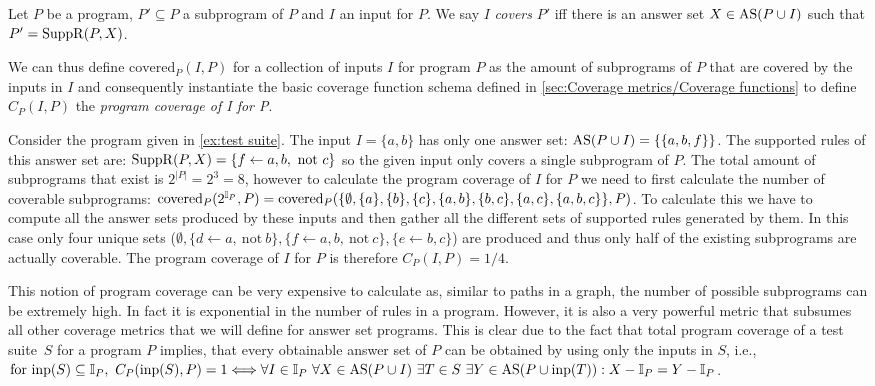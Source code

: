 \begin{definition}
\label{def:program coverage}
    Let $P$ be a program, \(P' \subseteq P\) a subprogram of $P$ and $I$ an input for $P$. We say $I$ \emph{covers} $P'$ iff there is an answer set \(X \in \operatorname{AS}(P \cup I)\) such that \(P' = \operatorname{SuppR}(P, X)\).
\end{definition}

We can thus define \(\text{covered}_P(I, P)\) for a collection of inputs $I$ for program $P$ as the amount of subprograms of $P$ that are covered by the inputs in $I$ and consequently instantiate the basic coverage function schema defined in \cref{sec:Coverage metrics/Coverage functions} to define \(C_P(I, P)\) the \emph{program coverage of I for P}.

\begin{example}
\label{ex:program coverage}
    Consider the program given in \cref{ex:test suite}. The input \(I = \{a, b\}\) has only one answer set: \(\operatorname{AS}(P \cup I) = \{\{a, b, f\}\}\). The supported rules of this answer set are: \(\SuppR(P, X) = \{f \leftarrow a, b,\ \text{not}\ c\}\) so the given input only covers a single subprogram of $P$. The total amount of subprograms that exist is \(2^{|P|} = 2^3 = 8\), however to calculate the program coverage of $I$ for $P$ we need to first calculate the number of coverable subprograms: \(\text{covered}_P(2^{\mathbb{I}_P},P) = \text{covered}_P(\{\emptyset, \{a\}, \{b\}, \{c\}, \{a, b\}, \{b, c\}, \{a, c\}, \\ \{a, b, c\}\},P)\). To calculate this we have to compute all the answer sets produced by these inputs and then gather all the different sets of supported rules generated by them. In this case only four unique sets (\(\emptyset, \{d \leftarrow a,\ \text{not}\ b\}, \{f \leftarrow a, b,\ \text{not}\ c\}, \{e \leftarrow b, c\}\)) are produced and thus only half of the existing subprograms are actually coverable. The program coverage of $I$ for $P$ is therefore \(C_P(I, P) = 1/4\).
\end{example}

This notion of program coverage can be very expensive to calculate as, similar to paths in a graph, the number of possible subprograms can be extremely high. In fact it is exponential in the number of rules in a program. However, it is also a very powerful metric that subsumes all other coverage metrics that we will define for answer set programs. This is clear due to the fact that total program coverage of a test suite~$S$ for a program $P$ implies, that every obtainable answer set of $P$ can be obtained by using only the inputs in $S$, i.e., 
\(
    \text{for inp}(S) \subseteq \mathbb{I}_P,\ C_P(\operatorname{inp}(S),P) = 1 \Longleftrightarrow \forall I \in \mathbb{I}_P \ \forall X \in \operatorname{AS}(P \cup I) \ \exists T \in S \ \exists Y \in \operatorname{AS}(P \cup \operatorname{inp}(T)) : X - \mathbb{I}_P = Y - \mathbb{I}_P
\).

